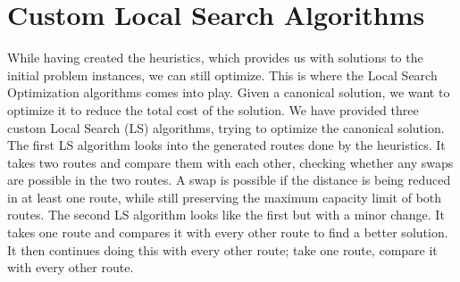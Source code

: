 \documentclass[12pt]{article}
\newcommand{\var}{\texttt}
\begin{document}
			
	

	\section{Custom Local Search Algorithms}
	While having created the heuristics, which provides us with solutions to the initial problem instances, we can still optimize. This is where the Local Search Optimization algorithms comes into play. 
	Given a canonical solution, we want to optimize it to reduce the total cost of the solution. We have provided three custom Local Search (LS) algorithms, trying to optimize the canonical solution. 
	\newline
	The first LS algorithm looks into the generated routes done by the heuristics. It takes two routes and compare them with each other, checking whether any swaps are possible in the two routes. 
	A swap is possible if the distance is being reduced in at least one route, while still preserving the maximum capacity limit of both routes. 
	The second LS algorithm looks like the first but with a minor change. It takes one route and compares it with every other route to find a better solution. It then continues doing this 
	with every other route; take one route, compare it with every other route. 
		 

\newpage


\end{document}
